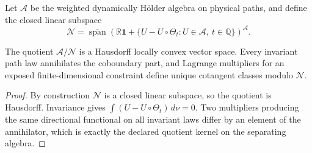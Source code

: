 Let \(\mathscr A\) be the weighted dynamically Hölder algebra on physical
paths, and define the closed linear subspace
\[
 \mathscr N
 =
 \overline{\operatorname{span}}\left(
 \mathbb R\mathbf1+
 \{U-U\circ\Theta_t:U\in\mathscr A,\ t\in\mathbb Q\}
 \right)^{\mathscr A}.
\]

\begin{proposition}
\label{prop:rr2-a3-quotient}
The quotient \(\mathscr A/\mathscr N\) is a Hausdorff locally convex vector
space.  Every invariant path law annihilates the coboundary part, and
Lagrange multipliers for an exposed finite-dimensional constraint define
unique cotangent classes modulo \(\mathscr N\).
\end{proposition}

\begin{proof}
By construction \(\mathscr N\) is a closed linear subspace, so the quotient
is Hausdorff.  Invariance gives
\(\int(U-U\circ\Theta_t)\,d\nu=0\).  Two multipliers producing the same
directional functional on all invariant laws differ by an element of the
annihilator, which is exactly the declared quotient kernel on the separating
algebra.
\end{proof}
